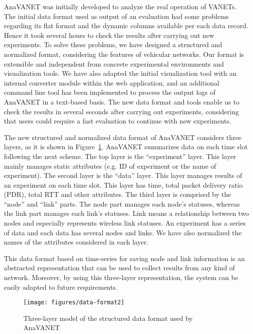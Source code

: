 \documentclass[fonts]{icst}
\begin{document}
AnaVANET was initially developed to analyze the real operation of VANETs. The initial data format used as output of an evaluation had some problems regarding its flat format and the dynamic columns available per each data record. Hence it took several hours to check the results after carrying out new experiments. To
solve these problems, we have designed a structured and normalized format,
considering the features of vehicular networks. Our format is extensible and independent from concrete experimental environments and visualization tools. We have also adapted the initial visualization tool with an internal converter module within the web application, and an additional command line tool has been implemented to process the output logs of AnaVANET in a text-based basis. The new data format and tools enable us to check the results in several seconds after carrying out experiments, considering that users could require a fast evaluation to continue with new experiments.

The new structured and normalized data format of AnaVANET considers three layers, as it is shown in Figure~\ref{fig:data-format}. AnaVANET summarizes data on each time slot following the next scheme. The top layer is the ``experiment'' layer. This layer mainly manages static attributes (e.g. ID of experiment or the name of
experiment). The second layer is the ``data'' layer. This layer manages results of an
experiment on each time slot. This layer has time, total packet delivery ratio
(PDR), total RTT and other attributes. The third layer is comprised by the ``node'' and ``link'' parts.
The node part manages each node's statuses, whereas the link part manages each link's
statuses. Link means a relationship between two nodes and especially represents
wireless link statuses. An experiment has a series of data and each data has
several nodes and links. We have also normalized the names of the attributes considered in each layer.

This data format based on time-series for saving node and link information is an abstracted representation that can be used to collect results from any kind of network. Moreover, by using this three-layer representation, the system can be easily adapted to future requirements. 

\begin{figure}[htbp]
   \begin{center}
       \texttt{[image: figures/data-format2]}
      \caption{Three-layer model of the structured data format used by AnaVANET}
      \label{fig:data-format}
  \end{center}
\end{figure}
\end{document}

